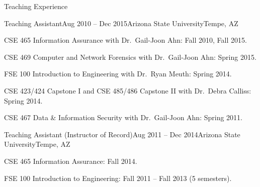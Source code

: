 \begin{rSection}{Teaching Experience}

  \begin{rExperienceBullets}{Teaching Assistant}{Aug 2010 -- Dec 2015}{Arizona State University}{Tempe, AZ}

    \item CSE 465 Information Assurance with Dr.\ Gail-Joon Ahn: Fall 2010, Fall 2015.

    \item CSE 469 Computer and Network Forensics with Dr.\ Gail-Joon Ahn: Spring 2015.

    \item FSE 100 Introduction to Engineering with Dr.\ Ryan Meuth: Spring 2014.

    \item CSE 423/424 Capstone I and CSE 485/486 Capstone II with Dr.\ Debra Calliss: Spring 2014.

    \item CSE 467 Data \& Information Security with Dr.\ Gail-Joon Ahn: Spring 2011.

  \end{rExperienceBullets}

  \begin{rExperienceBullets}{Teaching Assistant (Instructor of Record)}{Aug 2011 -- Dec 2014}{Arizona State University}{Tempe, AZ}

    \item CSE 465 Information Assurance: Fall 2014.

    \item FSE 100 Introduction to Engineering: Fall 2011 -- Fall 2013 (5 semesters).

  \end{rExperienceBullets}

\end{rSection}

